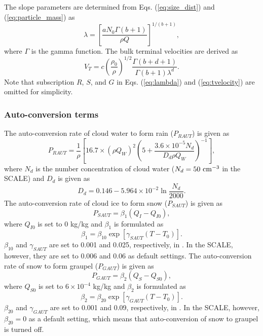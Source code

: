 The slope parameters are determined from Eqs. (\ref{eq:size_dist}) and (\ref{eq:particle_mass}) as
\begin{equation}
  \lambda=\left[\frac{aN_{0}\Gamma (b+1)}{\rho Q}\right]^{1/(b+1)}\label{eq:lambda},
\end{equation}
where $\Gamma$ is the gamma function. The bulk terminal velocities are derived as
\begin{equation}
  V_{T}=c\left(\frac{\rho_{0}}{\rho}\right)^{1/2}\frac{\Gamma(b+d+1)}{\Gamma(b+1)\lambda^{d}}\label{eq:tvelocity}.
\end{equation}
Note that subscription $R$, $S$, and $G$ in Eqs. (\ref{eq:lambda}) and (\ref{eq:tvelocity}) are omitted for simplicity.

\subsubsection{Auto-conversion terms}
The auto-conversion rate of cloud water to form rain ($P_{RAUT}$) is given as
\begin{equation}
  P_{RAUT}=\frac{1}{\rho}\left[16.7\times(\rho Q_{W})^{2}\left(5+\frac{3.6\times10^{-5}N_{d}}{D_{d}\rho Q_{W}}\right)^{-1}\right],
\end{equation}
where $N_{d}$ is the number concentration of cloud water ($N_{d}=50 {\rm \ cm^{-3}}$ in the SCALE) and $D_{d}$ is given as
\begin{equation}
  D_{d}=0.146-5.964\times10^{-2}\ln{\frac{N_{d}}{2000}}.
\end{equation}
The auto-conversion rate of cloud ice to form snow ($P_{SAUT}$) is given as
\begin{equation}
  P_{SAUT}=\beta_{1}(Q_{I}-Q_{I0}),
\end{equation}
where $Q_{I0}$ is set to 0 kg/kg and $\beta_{1}$ is formulated as
\begin{equation}
  \beta_{1}=\beta_{10}\exp[\gamma_{SAUT}(T-T_{0})].
\end{equation}
$\beta_{10}$ and $\gamma_{SAUT}$ are set to 0.001 and 0.025, respectively, in \citet{tomita_2008}. In the SCALE, however, they are set to 0.006 and 0.06 as default settings. The auto-conversion rate of snow to form graupel ($P_{GAUT}$) is given as
\begin{equation}
  P_{GAUT}=\beta_{2}(Q_{S}-Q_{S0}),
\end{equation}
where $Q_{S0}$ is set to $6\times10^{-4}$ kg/kg and $\beta_{2}$ is formulated as
\begin{equation}
  \beta_{2}=\beta_{20}\exp[\gamma_{GAUT}(T-T_{0})].
\end{equation}
$\beta_{20}$ and $\gamma_{GAUT}$ are set to 0.001 and 0.09, respectively, in \citet{tomita_2008}. In the SCALE, however, $\beta_{20} = 0$ as a default setting, which means that auto-conversion of snow to graupel is turned off.

